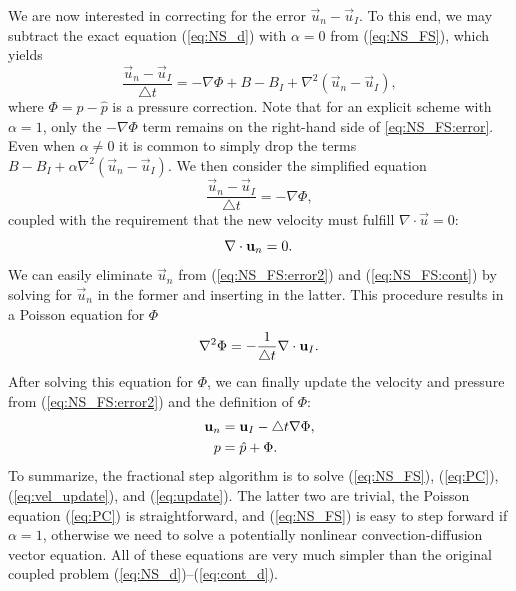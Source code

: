 We are now interested in correcting for the error $\vec{u}_n-\vec{u}_I$.
To this end, we may subtract the exact equation (\ref{eq:NS_d}) with
$\alpha = 0$ from
(\ref{eq:NS_FS}), which yields
\begin{equation}
\label{eq:NS_FS:error}
\frac{{\vec{u}}_{n}-\vec{u}_{I}}{\triangle t} = 
-\nabla\Phi + B - B_I + \nabla^2(\vec{u}_n-\vec{u}_I),
\end{equation}
where $\Phi = p - \hat{p} $ is a pressure correction.
Note that for an explicit scheme with $\alpha = 1$, only the
$-\nabla\Phi$ term remains on the right-hand side of \ref{eq:NS_FS:error}.
Even when $\alpha \neq 0$ it is common to simply drop
the terms $B - B_I + \alpha\nabla^2(\vec{u}_n-\vec{u}_I)$.
We then consider the simplified equation
\begin{equation}
\label{eq:NS_FS:error2}
\frac{{\vec{u}}_{n}-\vec{u}_{I}}{\triangle t} = 
-\nabla\Phi,
\end{equation}
coupled with the requirement that the new velocity must fulfill
$\nabla\cdot\vec{u}=0$:
\begin{equation}
 \label{eq:NS_FS:cont} \nabla \cdot \vec{u}_{n} =0 . \thinspace
\end{equation}
We can easily eliminate $\vec{u}_{n}$ from (\ref{eq:NS_FS:error2})
and (\ref{eq:NS_FS:cont}) by solving for $\vec{u}_{n}$ in the former
and inserting in the latter. This procedure results in a 
Poisson equation for $\Phi$
\begin{equation}
 \label{eq:PC} \nabla^2 \Phi = -\frac{1}{\triangle t} \nabla \cdot {\vec{u}}_{I} . \thinspace
\end{equation}
After solving this equation for $\Phi$, we can
finally update the velocity and pressure from (\ref{eq:NS_FS:error2})
and the definition of $\Phi$:
\begin{align}
 \label{eq:vel_update} \vec{u}_{n} &= {\vec{u}}_{I} - \triangle t \nabla \Phi, \\
  p &= \hat{p} + \Phi . \thinspace
\label{eq:update}
\end{align}
To summarize, the fractional step algorithm is to solve
(\ref{eq:NS_FS}), (\ref{eq:PC}), (\ref{eq:vel_update}), and
(\ref{eq:update}). The latter two are trivial, the Poisson
equation (\ref{eq:PC}) is straightforward, and (\ref{eq:NS_FS})
is easy to step forward if $\alpha=1$, otherwise we need to solve
a potentially nonlinear convection-diffusion vector equation.
All of these equations are very much simpler than the
original coupled problem (\ref{eq:NS_d})--(\ref{eq:cont_d}).


